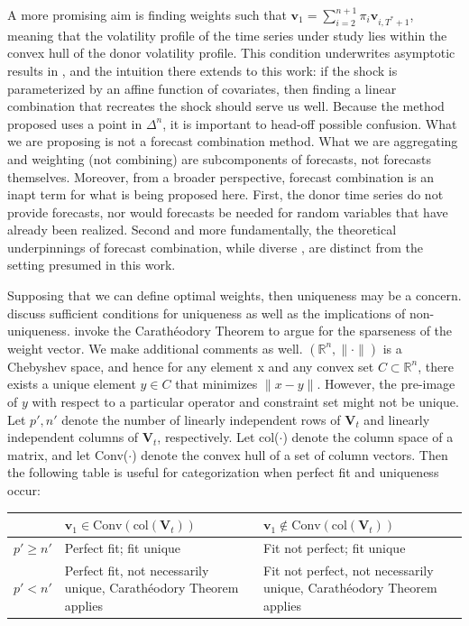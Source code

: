 \documentclass[11pt,3p,review,authoryear]{elsarticle}
\newcommand{\weight}{\pi}
\newcommand{\V}{\textbf{V}}
\theoremstyle{definition}
\begin{document}
A more promising aim is finding weights such that $\textbf{v}_{1} = \sum^{n+1}_{i=2}\weight_{i}\textbf{v}_{i,T^{*}+1}$, meaning that the volatility profile of the time series under study lies within the convex hull of the donor volatility profile.  This condition underwrites asymptotic results in \citet{abadie2010synthetic}, and the intuition there extends to this work: if the shock is parameterized by an affine function of covariates, then finding a linear combination that recreates the shock should serve us well.  Because the method proposed uses a point in $\Delta^{n}$, it is important to head-off possible confusion.  What we are proposing is not a forecast combination method.  What we are aggregating and weighting (not combining) are subcomponents of forecasts, not forecasts themselves.  Moreover, from a broader perspective, forecast combination is an inapt term for what is being proposed here.  First, the donor time series do not provide forecasts, nor would forecasts be needed for random variables that have already been realized.  Second and more fundamentally, the theoretical underpinnings of forecast combination, while diverse \citep{wang2023forecast}, are distinct from the setting presumed in this work.

Supposing that we can define optimal weights, then uniqueness may be a concern. \cite{lin2021minimizing} discuss sufficient conditions for uniqueness as well as the implications of non-uniqueness.  \cite{abadie2022synthetic} invoke the Carath\'eodory Theorem to argue for the sparseness of the weight vector.  We make additional comments as well. $(\mathbb{R}^{n}, \|\cdot\|)$ is a Chebyshev space, and hence for any element x and any convex set $C\subset \mathbb{R}^{n}$, there exists a unique element $y\in C$ that minimizes $\|x-y\|$.  However, the pre-image of $y$ with respect to a particular operator and constraint set might not be unique.  Let $p', n'$ denote the number of linearly independent rows of $\V_{t}$ and linearly independent columns of $\V_{t}$, respectively.  Let col($\cdot$) denote the column space of a matrix, and let Conv($\cdot$) denote the convex hull of a set of column vectors. Then the following table is useful for categorization when perfect fit and uniqueness occur: \\

    \begin{center}
      \begin{tabular}{ | m{3em} | m{7cm}| m{7cm} | } 
        \hline
        & $\textbf{v}_{1}\in \text{Conv}(\text{col}(\V_{t}))$ & $\textbf{v}_{1} \notin \text{Conv}(\text{col}(\V_{t}))$\\ 
        \hline
        $p' \geq n'$ & Perfect fit; fit unique & Fit not perfect; fit unique \\
        \hline
        $p' < n'$ & Perfect fit, not necessarily unique, Carath\'eodory Theorem applies& Fit not perfect, not necessarily unique, Carath\'eodory Theorem applies \\ 
        \hline
      \end{tabular}
      \end{center} 
\end{document}
